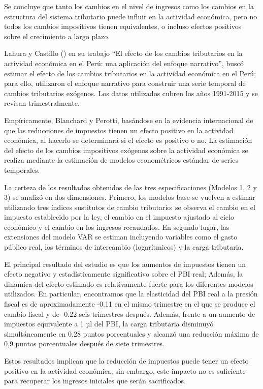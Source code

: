 \documentclass[
  jou,
  floatsintext,
  longtable,
  a4paper,
  nolmodern,
  notxfonts,
  notimes,
  12pt,
  colorlinks=true,linkcolor=blue,citecolor=blue,urlcolor=blue]{apa7}
\begin{document}
Se concluye que tanto los cambios en el nivel de ingresos como los
cambios en la estructura del sistema tributario puede influir en la
actividad económica, pero no todos los cambios impositivos tienen
equivalentes, o incluso efectos positivos sobre el crecimiento a largo
plazo.

Lahura y Castillo () en su
trabajo ``El efecto de los cambios tributarios en la actividad económica
en el Perú: una aplicación del enfoque narrativo'', buscó estimar el
efecto de los cambios tributarios en la actividad económica en el Perú;
para ello, utilizaron el enfoque narrativo para construir una serie
temporal de cambios tributarios exógenos. Los datos utilizados cubren
los años 1991-2015 y se revisan trimestralmente.

Empíricamente, Blanchard y Perotti, basándose en la evidencia
internacional de que las reducciones de impuestos tienen un efecto
positivo en la actividad económica, al hacerlo se determinará si el
efecto es positivo o no. La estimación del efecto de los cambios
impositivos exógenos sobre la actividad económica se realiza mediante la
estimación de modelos econométricos estándar de series temporales.

La certeza de los resultados obtenidos de las tres especificaciones
(Modelos 1, 2 y 3) se analizó en dos dimensiones. Primero, los modelos
base se vuelven a estimar utilizando tres índices sustitutos de cambio
tributario: se observa el cambio en el impuesto establecido por la ley,
el cambio en el impuesto ajustado al ciclo económico y el cambio en los
ingresos recaudados. En segundo lugar, las extensiones del modelo VAR se
estiman incluyendo variables como el gasto público real, los términos de
intercambio (logarítmicos) y la carga tributaria.

El principal resultado del estudio es que los aumentos de impuestos
tienen un efecto negativo y estadísticamente significativo sobre el PBI
real; Además, la dinámica del efecto estimado es relativamente fuerte
para los diferentes modelos utilizados. En particular, encontramos que
la elasticidad del PBI real a la presión fiscal es de aproximadamente
-0.11 en el mismo trimestre en el que se produce el cambio fiscal y de
-0.22 seis trimestres después. Además, frente a un aumento de impuestos
equivalente a 1 µl del PBI, la carga tributaria disminuyó
simultáneamente en 0.28 puntos porcentuales y alcanzó una reducción
máxima de 0,9 puntos porcentuales después de siete trimestres.

Estos resultados implican que la reducción de impuestos puede tener un
efecto positivo en la actividad económica; sin embargo, este impacto no
es suficiente para recuperar los ingresos iniciales que serán
sacrificados.
\end{document}
